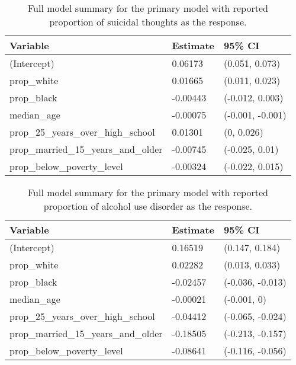 \documentclass{article}
\begin{document}
\begin{table}[!htb]
\begin{center}
    \begin{tabular}{lll}
    \toprule
    Variable & Estimate & 95\% CI\\
    \midrule
    (Intercept) & 0.06173 & (0.051, 0.073)\\
    prop\_white & 0.01665 & (0.011, 0.023)\\
    prop\_black & -0.00443 & (-0.012, 0.003)\\
    median\_age & -0.00075 & (-0.001, -0.001)\\
    prop\_25\_years\_over\_high\_school & 0.01301 & (0, 0.026)\\
    prop\_married\_15\_years\_and\_older & -0.00745 & (-0.025, 0.01)\\
    prop\_below\_poverty\_level & -0.00324 & (-0.022, 0.015)\\
    \bottomrule
\end{tabular}
\end{center}
\caption{\label{tab:primary-suicidal-thoughts-full-summary}
    Full model summary for the primary model with
    reported proportion of suicidal thoughts
    as the response.
}
\end{table}

\begin{table}[!htb]
\begin{center}
    \begin{tabular}{lll}
        \toprule
        Variable & Estimate & 95\% CI\\
        \midrule
        (Intercept) & 0.16519 & (0.147, 0.184)\\
        prop\_white & 0.02282 & (0.013, 0.033)\\
        prop\_black & -0.02457 & (-0.036, -0.013)\\
        median\_age & -0.00021 & (-0.001, 0)\\
        prop\_25\_years\_over\_high\_school & -0.04412 & (-0.065, -0.024)\\
        prop\_married\_15\_years\_and\_older & -0.18505 & (-0.213, -0.157)\\
        prop\_below\_poverty\_level & -0.08641 & (-0.116, -0.056)\\
        \bottomrule
    \end{tabular}
\end{center}
\caption{\label{tab:primary-alcohol-use-full-summary}
    Full model summary for the primary model with
    reported proportion of alcohol use disorder
    as the response.
}
\end{table}
\end{document}
